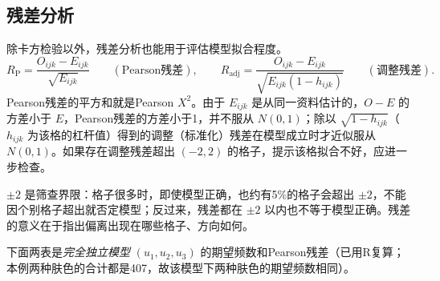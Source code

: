 \subsection{残差分析}
除卡方检验以外，残差分析也能用于评估模型拟合程度。
\[
R_{\mathrm{P}}=\frac{O_{ijk}-E_{ijk}}{\sqrt{E_{ijk}}}\qquad(\text{Pearson残差}),\qquad
R_{\mathrm{adj}}=\frac{O_{ijk}-E_{ijk}}{\sqrt{E_{ijk}(1-h_{ijk})}}\qquad(\text{调整残差}).
\]
Pearson残差的平方和就是Pearson $X^2$。由于 $E_{ijk}$ 是从同一资料估计的，$O-E$ 的方差小于 $E$，Pearson残差的方差小于1，并不服从 $N(0,1)$；除以 $\sqrt{1-h_{ijk}}$（$h_{ijk}$ 为该格的杠杆值）得到的调整（标准化）残差在模型成立时才近似服从 $N(0,1)$。如果存在调整残差超出 $(-2,2)$ 的格子，提示该格拟合不好，应进一步检查。
\begin{annotation}$\pm2$ 是筛查界限：格子很多时，即使模型正确，也约有5\%的格子会超出 $\pm2$，不能因个别格子超出就否定模型；反过来，残差都在 $\pm2$ 以内也不等于模型正确。残差的意义在于指出偏离出现在哪些格子、方向如何。\end{annotation}
下面两表是\emph{完全独立模型} $(u_1,u_2,u_3)$ 的期望频数和Pearson残差（已用R复算；本例两种肤色的合计都是407，故该模型下两种肤色的期望频数相同）。
